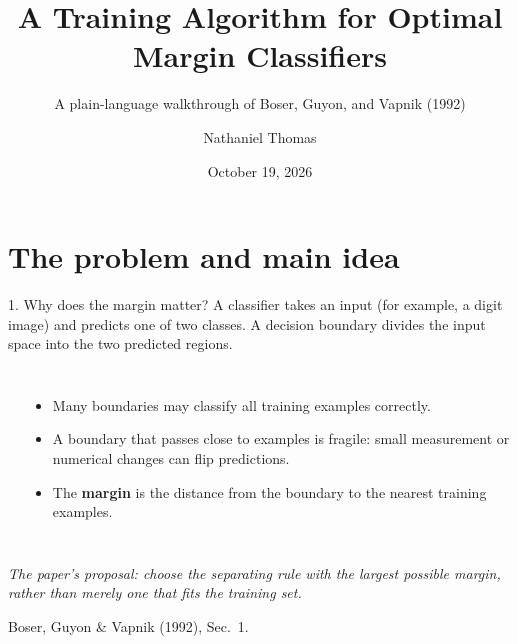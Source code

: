 \documentclass[10pt,compress]{beamer}
\title[Optimal-margin classifiers (1992)]{A Training Algorithm for Optimal Margin Classifiers}
\subtitle{A plain-language walkthrough of Boser, Guyon, and Vapnik (1992)}
\author[Thomas]{Nathaniel Thomas}
\date[October 19, 2026]{October 19, 2026}
\institute[Texas A\&M University]{Texas A\&M University}
\newcommand{\defline}[1]{{\footnotesize\textcolor{aggiemaroon}{\textit{#1}}\par}}
\begin{document}
\begin{frame}\titlepage\end{frame}

\section[Motivation]{The problem and main idea}
\begin{frame}{1. Why does the margin matter?}
A classifier takes an input (for example, a digit image) and predicts one of two classes. A decision boundary divides the input space into the two predicted regions.
\begin{columns}[T]
\begin{center}
\end{center}
\begin{itemize}\small
\item Many boundaries may classify all training examples correctly.
\item A boundary that passes close to examples is fragile: small measurement or numerical changes can flip predictions.
\item The \textbf{margin} is the distance from the boundary to the nearest training examples.
\end{itemize}
\end{columns}
\defline{The paper's proposal: choose the separating rule with the largest possible margin, rather than merely one that fits the training set.}
{\scriptsize Boser, Guyon \& Vapnik (1992), Sec.~1.}
\end{frame}
\end{document}
